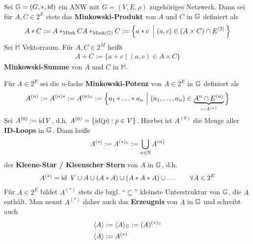 \begin{proposition}\enter
    Sei $\mathbb{G}=(G,\ast,\operatorname{id})$ ein ANW mit $G=(V,E,\rho)$ zugehöriges Netzwerk. Dann sei für $A,C\in 2^E$ stets das \textbf{Minkowski-Produkt} von $A$ und $C$ in $\mathbb{G}$ definiert als
    \begin{align*}
        A\ast C
        :=A\ast_{\text{Mink}} C
        A\ast_{\text{Mink}(\mathbb{G})} C
        :=\left\lbrace a\ast c~\left|~(a,c)\in (A\times C)\cap E^{\langle2\rangle}\right.\right\rbrace
    \end{align*}
    Sei $\mathbb{M}$ Vektorraum. Für $A,C\in 2^M$ heißt
    \begin{align*}
        A+C:=\big\lbrace a+c\mid (a,c)\in A\times C\big\rbrace
    \end{align*}
    \textbf{Minkowski-Summe} von $A$ und $C$ in $\mathbb{M}$.

    Für $A\in 2^E$ sei die $n$-fache \textbf{Minkowski-Potenz} von $A\in 2^E$ in $\mathbb{G}$ definiert als
    \begin{align*}
        A^{(n)}
        := A^{(n)\ast}
        := A^{(n)_{\mathbb{G}}}
        :=\Big\lbrace a_1\ast\ldots\ast a_n~\Big|~(a_1,\ldots,a_n)\in \underbrace{A^n\cap E^{\langle n\rangle}}_{=:A^{\langle n\rangle}}\Big\rbrace
    \end{align*}
    Sei $A^{(0)}:=\operatorname{id} V$, d.h. $A^{(0)}=\lbrace\operatorname{id}(p):p\in V\rbrace$. Hierbei ist $A^{(0)}$ die Menge aller \textbf{ID-Loops} in $\mathbb{G}$.
    Dann heiße
    \begin{align*}
        A^{(\ast)}:=A^{(\ast)_{\mathbb{G}}}:=\bigcup\limits_{n\in\mathbb{N}} A^{(n)}
    \end{align*}
    der \textbf{Kleene-Star / Kleenscher Stern} von $A$ in $\mathbb{G}$, d.h.
    \begin{align*}
        A^{(\ast)}=\operatorname{id}~V\cup A\cup (A\ast A)\cup (A\ast A\ast A)\cup\ldots\qquad\forall A\in 2^E
    \end{align*}
    Für $A\in 2^E$ bildet $A^{(\ast)}$ stets die bzgl. ``$\subseteq$'' kleinste Unterstruktur von $\mathbb{G}$, die $A$ enthält. Man nennt $A^{(\ast)}$ daher auch das \textbf{Erzeugnis} von $A$ in $\mathbb{G}$ und schreibt auch
    \begin{align*}
        \langle A\rangle &:=\langle A\rangle_{\mathbb{G}}:=(A)^{(\ast)_{\mathbb{G}}}\\
        \langle A\rangle&:=A^{(\ast)}
    \end{align*}
\end{proposition}

